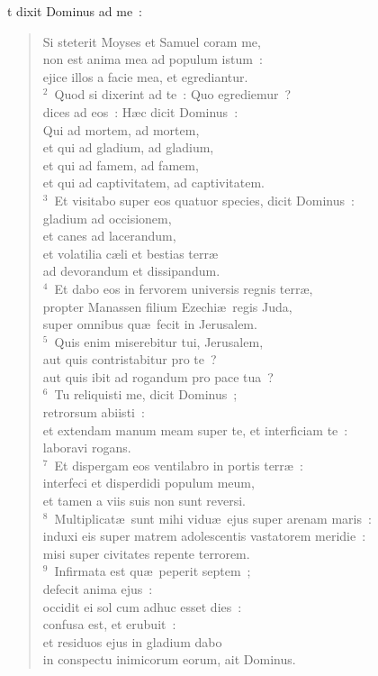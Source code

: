 \bchapter
{}t dixit Dominus ad me~: \begin{flushleft}\begin{verse}\vspace{6pt}Si steterit Moyses et Samuel coram me,\\ non est anima mea ad populum istum~:\\ ejice illos a facie mea, et egrediantur.\\
${}^{2}$~Quod si dixerint ad te~: Quo egrediemur~?\\ dices ad eos~: H\ae c dicit Dominus~:\\ Qui ad mortem, ad mortem,\\ et qui ad gladium, ad gladium,\\ et qui ad famem, ad famem,\\ et qui ad captivitatem, ad captivitatem.\\
${}^{3}$~Et visitabo super eos quatuor species, dicit Dominus~:\\ gladium ad occisionem,\\ et canes ad lacerandum,\\ et volatilia c\ae li et bestias terr\ae \\ ad devorandum et dissipandum.\\
${}^{4}$~Et dabo eos in fervorem universis regnis terr\ae ,\\ propter Manassen filium Ezechi\ae\ regis Juda,\\ super omnibus qu\ae\ fecit in Jerusalem.\\
${}^{5}$~Quis enim miserebitur tui, Jerusalem,\\ aut quis contristabitur pro te~?\\ aut quis ibit ad rogandum pro pace tua~?\\
${}^{6}$~Tu reliquisti me, dicit Dominus~;\\ retrorsum abiisti~:\\ et extendam manum meam super te, et interficiam te~:\\ laboravi rogans.\\
${}^{7}$~Et dispergam eos ventilabro in portis terr\ae~:\\ interfeci et disperdidi populum meum,\\ et tamen a viis suis non sunt reversi.\\
${}^{8}$~Multiplicat\ae\ sunt mihi vidu\ae\ ejus super arenam maris~:\\ induxi eis super matrem adolescentis vastatorem meridie~:\\ misi super civitates repente terrorem.\\
${}^{9}$~Infirmata est qu\ae\ peperit septem~;\\ defecit anima ejus~:\\ occidit ei sol cum adhuc esset dies~:\\ confusa est, et erubuit~:\\ et residuos ejus in gladium dabo\\ in conspectu inimicorum eorum, ait Dominus.\end{verse}\end{flushleft}


